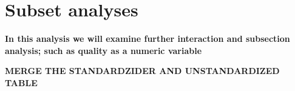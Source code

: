 \documentclass[a4paper]{article}
\begin{document}
\section{Subset analyses}
\textbf{In this analysis we will examine further interaction and subsection analysis; such as quality as a numeric variable}














 
 

\textbf{MERGE THE STANDARDZIDER AND UNSTANDARDIZED TABLE}
\end{document}
